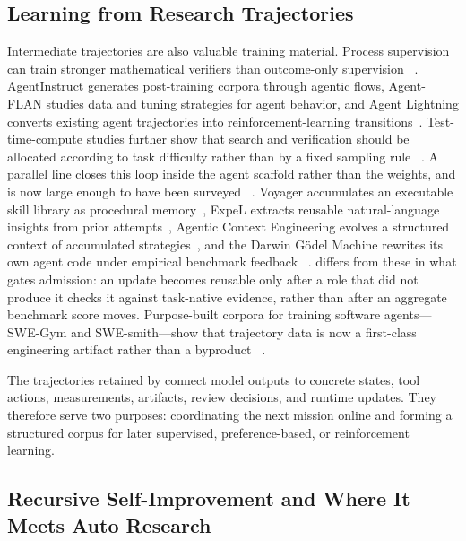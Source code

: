\subsection{Learning from Research Trajectories}

Intermediate trajectories are also valuable training material. Process supervision
can train stronger mathematical verifiers than outcome-only supervision
~\citep{lightman2023verify}. AgentInstruct generates post-training corpora through
agentic flows, Agent-FLAN studies data and tuning strategies for agent behavior,
and Agent Lightning converts existing agent trajectories into reinforcement-learning
transitions~\citep{mitra2024agentinstruct,chen2024agentflan,luo2025agentlightning}.
Test-time-compute studies further show that search and verification should be
allocated according to task difficulty rather than by a fixed sampling rule
~\citep{snell2024testtime}. A parallel line closes this loop inside the agent
scaffold rather than the weights, and is now large enough to have been surveyed
~\citep{gao2025selfevolvingsurvey}. Voyager accumulates an executable skill library
as procedural memory~\citep{wang2023voyager}, ExpeL extracts reusable natural-language
insights from prior attempts~\citep{zhao2024expel}, Agentic Context Engineering
evolves a structured context of accumulated strategies~\citep{zhang2025ace}, and the
Darwin G\"odel Machine rewrites its own agent code under empirical benchmark feedback
~\citep{zhang2025darwingodel}. \systemname{} differs from these in what gates
admission: an update becomes reusable only after a role that did not produce it
checks it against task-native evidence, rather than after an aggregate benchmark
score moves. Purpose-built corpora for training
software agents---SWE-Gym and SWE-smith---show that trajectory data is now a
first-class engineering artifact rather than a byproduct
~\citep{pan2024swegym,yang2025swesmith}.

The trajectories retained by \systemname connect model outputs to concrete states,
tool actions, measurements, artifacts, review decisions, and runtime updates. They
therefore serve two purposes: coordinating the next mission online and forming a
structured corpus for later supervised, preference-based, or reinforcement learning.

\subsection{Recursive Self-Improvement and Where It Meets Auto Research}
\label{sec:rsi-related}

